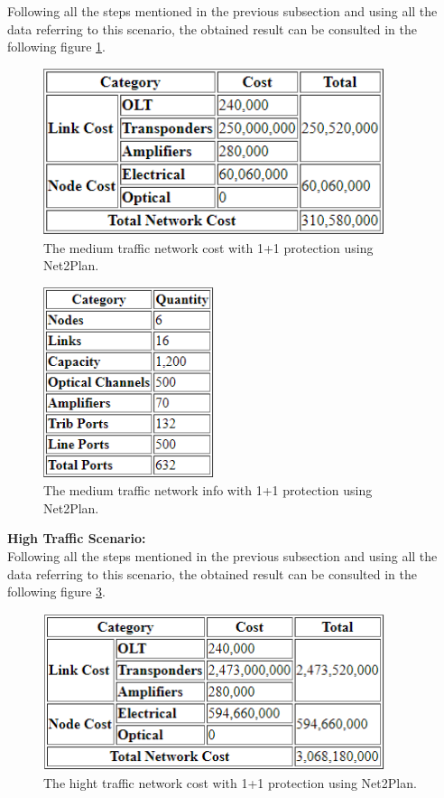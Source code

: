Following all the steps mentioned in the previous subsection and using all the data referring to this scenario, the obtained result can be consulted in the following figure \ref{Medium_Network_Cost_Protec_Opaque}.

\begin{figure}[h!]
\centering
\includegraphics[width=10cm]{sdf/heuristic/figures/Medium_Network_Cost_Protec_Opaque}
\caption{The medium traffic network cost with 1+1 protection using Net2Plan.}
\label{Medium_Network_Cost_Protec_Opaque}
\end{figure}

\begin{figure}[h!]
\centering
\includegraphics[width=5cm]{sdf/heuristic/figures/Medium_Network_Info_Protec_Opaque}
\caption{The medium traffic network info with 1+1 protection using Net2Plan.}
\label{Medium_Network_Info_Protec_Opaque}
\end{figure}

\newpage
\textbf{High Traffic Scenario:}\\

Following all the steps mentioned in the previous subsection and using all the data referring to this scenario, the obtained result can be consulted in the following figure \ref{High_Network_Cost_Protec_Opaque}.

\begin{figure}[h!]
\centering
\includegraphics[width=10cm]{sdf/heuristic/figures/High_Network_Cost_Protec_Opaque}
\caption{The hight traffic network cost with 1+1 protection using Net2Plan.}
\label{High_Network_Cost_Protec_Opaque}
\end{figure}


